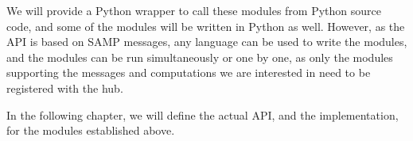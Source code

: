 \begin{description}
			We will provide a Python wrapper to call these
			modules from Python source code, and some of the
			modules will be written in Python as well. However,
			as the API is based on SAMP messages, any language can
			be used to write the modules, and the modules can be
			run simultaneously or one by one, as only the modules
			supporting the messages and computations we are 
			interested in need to be  
			registered with the hub.
		\end{description}
		
		In the following chapter, we will define the actual API,
		and the implementation, for the modules established above.
		
	
